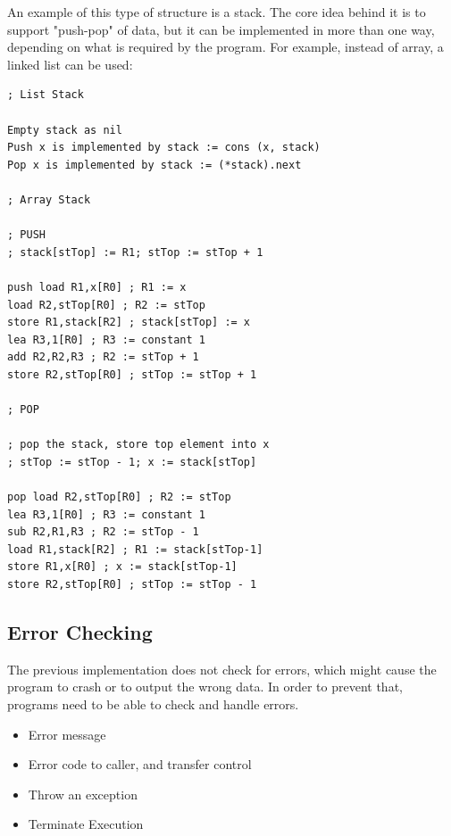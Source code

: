 \documentclass[english,course]{Notes}
\begin{document}
{

\par{An example of this type of structure is a stack. The core idea behind it is to support "push-pop" of data, but it can be implemented in more than one way, depending on what is required by the program. For example, instead of array, a linked list can be used:}

\begin{lstlisting}
; List Stack

Empty stack as nil
Push x is implemented by stack := cons (x, stack)
Pop x is implemented by stack := (*stack).next

; Array Stack

; PUSH
; stack[stTop] := R1; stTop := stTop + 1

push load R1,x[R0] ; R1 := x
load R2,stTop[R0] ; R2 := stTop
store R1,stack[R2] ; stack[stTop] := x
lea R3,1[R0] ; R3 := constant 1
add R2,R2,R3 ; R2 := stTop + 1
store R2,stTop[R0] ; stTop := stTop + 1

; POP

; pop the stack, store top element into x
; stTop := stTop - 1; x := stack[stTop]

pop load R2,stTop[R0] ; R2 := stTop
lea R3,1[R0] ; R3 := constant 1
sub R2,R1,R3 ; R2 := stTop - 1
load R1,stack[R2] ; R1 := stack[stTop-1]
store R1,x[R0] ; x := stack[stTop-1]
store R2,stTop[R0] ; stTop := stTop - 1

\end{lstlisting}

\subsection{Error Checking}

\par{The previous implementation does not check for errors, which might cause the program to crash or to output the wrong data. In order to prevent that, programs need to be able to check and handle errors.}

\begin{itemize}
	\item Error message
	\item Error code to caller, and transfer control
	\item Throw an exception
	\item Terminate Execution
\end{itemize}

}
\end{document}
